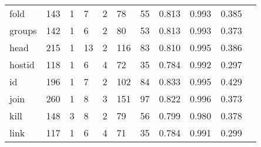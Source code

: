 \begin{longtable}{lp{1.10cm}p{1.10cm}p{1.10cm}p{1.10cm}p{1.10cm}p{1.10cm}p{1.10cm}p{1.10cm}p{1.10cm}p{1.10cm}}
fold      &                    143 &                                  1 &                                 7 &                                2 &                                78 &                              55 &                             0.813 &                                 0.993 &                               0.385 \\
groups    &                    142 &                                  1 &                                 6 &                                2 &                                80 &                              53 &                             0.813 &                                 0.993 &                               0.373 \\
head      &                    215 &                                  1 &                                13 &                                2 &                               116 &                              83 &                             0.810 &                                 0.995 &                               0.386 \\
hostid    &                    118 &                                  1 &                                 6 &                                4 &                                72 &                              35 &                             0.784 &                                 0.992 &                               0.297 \\
id        &                    196 &                                  1 &                                 7 &                                2 &                               102 &                              84 &                             0.833 &                                 0.995 &                               0.429 \\
join      &                    260 &                                  1 &                                 8 &                                3 &                               151 &                              97 &                             0.822 &                                 0.996 &                               0.373 \\
kill      &                    148 &                                  3 &                                 8 &                                2 &                                79 &                              56 &                             0.799 &                                 0.980 &                               0.378 \\
link      &                    117 &                                  1 &                                 6 &                                4 &                                71 &                              35 &                             0.784 &                                 0.991 &                               0.299 \\

\end{longtable}
